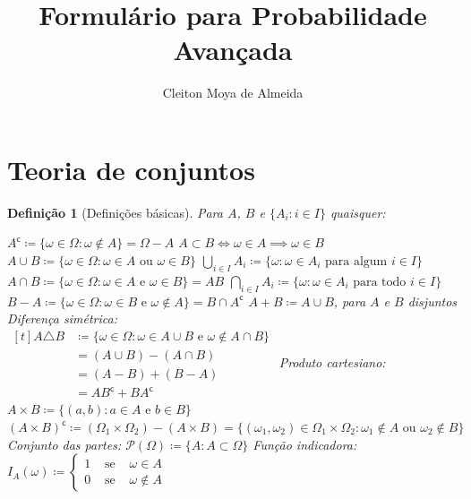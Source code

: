 \documentclass[12pt,a4paper,answers]{article}
\title{Formulário para Probabilidade Avançada}
\author{Cleiton Moya de Almeida}
\numberwithin{equation}{section} %
\newcommand{\cp}[1]{#1^\mathsf{c}} %
\theoremstyle{thm_estilo}
\newtheorem{definition}{Definição}[section]
\theoremstyle{thm_note_est}
\begin{document}
\maketitle

\section{Teoria de conjuntos}

\begin{definition}[Definições básicas] Para $A$, $B$ e $\{A_i: i \in I\}$ quaisquer:
	\begin{outline}
		\1 \( \cp{A} \coloneq \{ \omega\in\Omega : \omega \notin A\} = \Omega-A\)
		\1 \( A \subset B \iff \omega \in A \implies \omega \in B \)
		\1 \( A\cup B \coloneq \{ \omega\in\Omega : \omega \in A \text{ ou } \omega \in B\}\)
		\1 \( \bigcup_{i\in I}A_i \coloneq \{ \omega : \omega \in A_i \text{ para algum } i \in I \}\)
		\1 \( A\cap B \coloneq \{ \omega\in\Omega : \omega \in A \text{ e } \omega \in B\} = AB\)
		\1 \( \bigcap_{i\in I}A_i \coloneq \{ \omega : \omega \in A_i \text{ para todo } i \in I \}\)
		\1 \(B - A \coloneq \{ \omega\in\Omega : \omega \in B \text{ e } \omega \notin A\} = B\cap\cp{A} \)
		\1 \(A+B \coloneq A\cup B\), para $A$ e $B$ disjuntos
		\1 Diferença simétrica: \\ \(\begin{aligned}[t]
				A \triangle B &\coloneq \{ \omega\in\Omega : \omega \in A\cup B \text{ e } \omega 	\notin A\cap B\} \\
				&= (A\cup B) - (A\cap B) \\
				&= (A-B) + (B-A) \\
				&= A\cp{B}+B\cp{A}
			\end{aligned}\)
		\1 Produto cartesiano: \( A \times B \coloneq  \{ (a,b): a \in A \text{ e } b \in B\}\)
		\1 \( \cp{(A \times B)} \coloneq (\Omega_1\times\Omega_2)-(A\times B) = \{ (\omega_1,\omega_2) \in \Omega_1\times\Omega_2: \omega_1 \notin A \text{ ou } \omega_2 \notin B\}\)
		\1 Conjunto das partes: \( \mathcal{P}(\Omega) \coloneq \{A: A\subset \Omega\} \)
		\1 Função indicadora: \\
		\( I_A(\omega) \coloneq \left\{ \begin{array}{lcl} 
			1 & \text{ se } & \omega \in A \\ 
			0 & \text{ se } & \omega \notin A 
		\end{array} \right. \)
	\end{outline}	
\end{definition}
\end{document}

